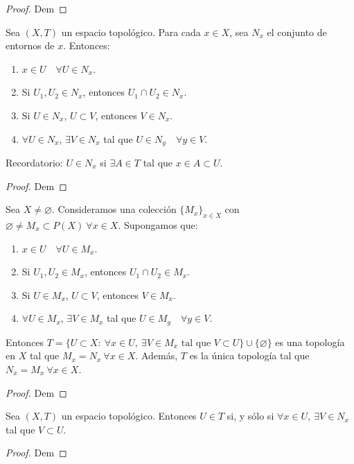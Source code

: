 \begin{proof}
    Dem
\end{proof}
\begin{lema}
  Sea $(X,T)$ un espacio topológico. Para cada $x \in X$, sea $N_x$ el conjunto de entornos de $x$. Entonces:
  \begin{enumerate}
      \item $x \in U \quad \forall U \in N_x$.
      \item Si $U_1, U_2 \in N_x$, entonces $U_1 \cap U_2 \in N_x$.
      \item Si $U \in N_x$, $U \subset V$, entonces $V \in N_x$.
      \item $\forall U \in N_x$, $\exists V \in N_x$ tal que $U \in N_y \quad \forall y \in V$.
  \end{enumerate}
\end{lema}
\begin{note}
    Recordatorio: $U \in N_x$ si $\exists A \in T$ tal que $x \in A \subset U$.
\end{note}
\begin{proof}
    Dem
\end{proof}
\begin{nth}
  Sea $X \neq \varnothing$. Consideramos una colección $\{M_x\}_{x \in X}$ con $\varnothing \neq M_x \subset P(X) \ \forall x \in X$. Supongamos que:
  \begin{enumerate}
      \item $x \in U \quad \forall U \in M_x$.
      \item Si $U_1, U_2 \in M_x$, entonces $U_1 \cap U_2 \in M_x$.
      \item Si $U \in M_x$, $U \subset V$, entonces $V \in M_x$.
      \item $\forall U \in M_x$, $\exists V \in M_x$ tal que $U \in M_y \quad \forall y \in V$.
  \end{enumerate}
  Entonces $T = \{U \subset X :\ \forall x \in U,\ \exists V \in M_x \text{ tal que } V \subset U\} \cup \{\varnothing\}$ es una topología en $X$ tal que $M_x = N_x\ \forall x \in X$. Además, $T$ es la única topología tal que $N_x = M_x\ \forall x \in X$. 
\end{nth}
\begin{proof}
    Dem
\end{proof}
\begin{lema}
  Sea $(X,T)$ un espacio topológico. Entonces $U \in T$ si, y sólo si $\forall x \in U,\ \exists V \in N_x$ tal que $V \subset U$.
\end{lema}
\begin{proof}
    Dem
\end{proof}

